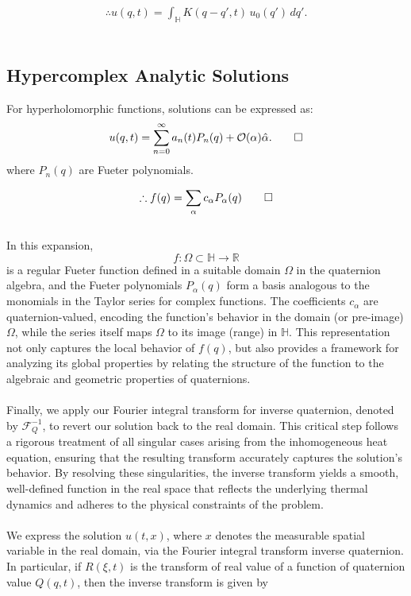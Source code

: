 \documentclass{article}
\begin{document}
\begin{align}
\therefore u(q,t) = \int_{\mathbb{H}} K(q - q', t) \, u_0(q') \, dq'.
\end{align} \\ 

\subsection{Hypercomplex Analytic Solutions}
For hyperholomorphic functions, solutions can be expressed as:
\[
u(q,t) = \sum_{n=0}^\infty a_n(t) P_n(q) + \mathcal{O}(\alpha) \hat\alpha. \qed
\]
where \(P_n(q)\) are Fueter polynomials. 

\begin{align}
\therefore f(q) = \sum_{\alpha} c_{\alpha} P_{\alpha}(q) \qed 
\end{align} \\ 
In this expansion, 
\[
f: \Omega \subset \mathbb{H} \to \mathbb{R}
\]
is a regular Fueter function defined in a suitable domain \(\Omega\) in the quaternion algebra, and the Fueter polynomials $P_{\alpha}(q)$ form a basis analogous to the monomials in the Taylor series for complex functions. The coefficients $c_{\alpha}$ are quaternion-valued, encoding the function's behavior in the domain (or pre-image) \(\Omega\), while the series itself maps \(\Omega\) to its image (range) in \(\mathbb{H}\). This representation not only captures the local behavior of \(f(q)\), but also provides a framework for analyzing its global properties by relating the structure of the function to the algebraic and geometric properties of quaternions. \\ \\ 
Finally, we apply our Fourier integral transform for inverse quaternion, denoted by \(\mathcal{F}_Q^{-1}\), to revert our solution back to the real domain. This critical step follows a rigorous treatment of all singular cases arising from the inhomogeneous heat equation, ensuring that the resulting transform accurately captures the solution's behavior. By resolving these singularities, the inverse transform yields a smooth, well-defined function in the real space that reflects the underlying thermal dynamics and adheres to the physical constraints of the problem. \\ \\ 
We express the solution \( u(t,x) \), where \( x \) denotes the measurable spatial variable in the real domain, via the Fourier integral transform inverse quaternion. In particular, if \( R(\xi,t) \) is the transform of real value of a function of quaternion value \( Q(q,t) \), then the inverse transform is given by
\end{document}
